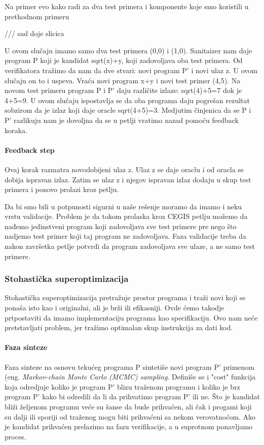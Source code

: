 Na primer evo kako radi za dva test primera i komponente koje smo koristili u prethodnom primeru

/// sad doje slicica

U ovom slučaju imamo samo dva test primera (0,0) i (1,0). Sanitaizer nam daje program P koji je kandidat sqrt(x)+y, koji zadovoljava oba test primera. Od verifikatora tražimo da nam da dve stvari: novi program P' i novi ulaz z. U ovom slučaju on to i uspeva. Vraća novi program x+y i novi test primer (4,5). Na novom test primeru program P i P' daju različite izlaze: sqrt(4)+5=7 dok je 4+5=9. U ovom slučaju ispostavlja se da oba programa daju pogrešan rezultat sobzirom da je izlaz koji daje oracle sqrt(4+5)=3. Medjutim činjenica da se P i P' razlikuju nam je dovoljna da se u petlji vratimo nazad pomoću feedback koraka.

\paragraph{Feedback step}

Ovaj korak razmatra novodobijeni ulaz z. Ulaz z se daje oraclu i od oracla se dobija ispravan izlaz. Zatim se ulaz z i njegov ispravan izlaz dodaju u skup test primera i ponovo prolazi kroz petlju.

Da bi smo bili u potpunosti sigurni u naše rešenje moramo da imamo i neku vrstu validacije. Problem je da tokom prolaska kroz CEGIS petlju možemo da nađemo jedinstveni program koji zadovoljava sve test primere pre nego što nadjemo test primer koji taj program ne zadovoljava. Faza validacije treba da nakon završetka petlje potvrdi da program zadovoljava sve ulaze, a ne samo test primere.

\subsubsection{Stohastička superoptimizacija}
\label{subsec:stohastickaSuperoptimizacija}

Stohastička superoptimizacija pretražuje prostor programa i traži novi koji se ponaša isto kao i originalni, ali je brži ili efikasniji. Ovde ćemo takodje prtpostaviti da imamo implementaciju programa kao specifikaciju. Ovo nam neće pretstavljati problem, jer tražimo optimalan skup instrukcija za dati kod.

\paragraph{Faza sinteze}
Faza sinteze na osnovu tekućeg programa P sintetiše novi program P' primenom (eng. \emph{Markov-chain Monte Carlo (MCMC) sampling}. Definiše se i "cost" funkcija koja odredjuje koliko je program P' blizu traženom programu i koliko je brz program P' kako bi odredili da li da prihvatimo program P' ili ne. Što je kandidat bliži željenom programu veće su šanse da bude prihvaćen, ali čak i progami koji su dalji ili sporiji od traženog mogu biti prihvaćeni sa nekom verovatnoćom. Ako je kandidat prihvaćen prelazimo na fazu verifikacije, a u suprotnom ponavljamo proces.

